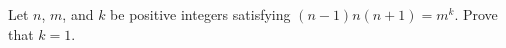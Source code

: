 Let $n$,  $m$,  and $k$ be positive integers satisfying $(n - 1)n(n + 1) = m^k$.  Prove that $k = 1$.